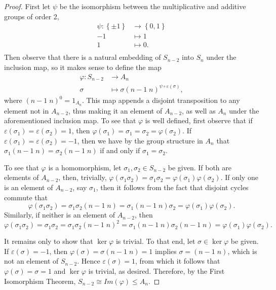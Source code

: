 \documentclass[10pt]{amsart}
\begin{document}
\begin{thm}
  \begin{proof}
    First let $\psi$ be the isomorphism between the multiplicative and additive groups of order 2,
    \begin{align*}
      \psi \colon \left\{\pm 1\right\} & \rightarrow \left\{0,1\right\}\\
        -1 & \mapsto 1\\
        1 & \mapsto 0.\\
    \end{align*}
    Then observe that there is a natural embedding of $S_{n-2}$ into $S_n$ under the inclusion map, so it makes sense to define the map 
    \begin{align*}
      \varphi \colon S_{n-2} & \rightarrow A_n\\
      \sigma & \mapsto \sigma \left( n-1\; n \right)^{\psi\circ\varepsilon(\sigma)},
    \end{align*}
    where $(n-1\; n)^{0} = 1_{A_n}$.
    This map appends a disjoint transposition to any element not in $A_{n-2}$, thus making it an element of $A_{n-2}$, as well as $A_n$ under the aforementioned inclusion map.
    To see that $\varphi$ is well defined, first observe that if $\varepsilon(\sigma_1) = \varepsilon(\sigma_2) = 1$, then $\varphi(\sigma_1) = \sigma_1 = \sigma_2 = \varphi(\sigma_2)$.
    If $\varepsilon(\sigma_1) = \varepsilon(\sigma_2) = -1$, then  we have by the group structure in $A_n$ that $\sigma_1(n-1\; n) = \sigma_2(n-1\; n)$ if and only if $\sigma_1 = \sigma_2$.

    To see that $\varphi$ is a homomorphism, let $\sigma_1, \sigma_2 \in S_{n-2}$ be given.
    If both are elements of $A_{n-2}$, then, trivially, $\varphi(\sigma_1\sigma_2) = \sigma_1\sigma_2 = \varphi(\sigma_1)\varphi(\sigma_2)$.
    If only one is an element of $A_{n-2}$, say $\sigma_1$, then it follows from the fact that disjoint cycles commute that
    $$\varphi(\sigma_1\sigma_2) = \sigma_1\sigma_2(n-1\; n) = \sigma_1(n-1\; n)\sigma_2 = \varphi(\sigma_1)\varphi(\sigma_2).$$
    Similarly, if neither is an element of $A_{n-2}$, then
    $$\varphi(\sigma_1\sigma_2) = \sigma_1\sigma_2 = \sigma_1\sigma_2(n-1\; n)^2 = \sigma_1(n-1\; n)\sigma_2(n-1\; n) = \varphi(\sigma_1)\varphi(\sigma_2).$$
    
    It remains only to show that $\ker\varphi$ is trivial.  
    To that end, let $\sigma \in \ker\varphi$ be given.
    If $\varepsilon(\sigma) = -1$, then $\varphi(\sigma) = \sigma(n-1\; n) = 1$ implies $\sigma = (n-1\; n)$, which is not an element of $S_{n-2}$.
    Hence $\varepsilon(\sigma) = 1$, from which it follows that $\varphi(\sigma) = \sigma = 1$ and $\ker\varphi$ is trivial, as desired.
    Therefore, by the First Isomorphism Theorem, $S_{n-2} \cong Im(\varphi) \leq A_n$.
    
  \end{proof}
\end{thm}
\end{document}
